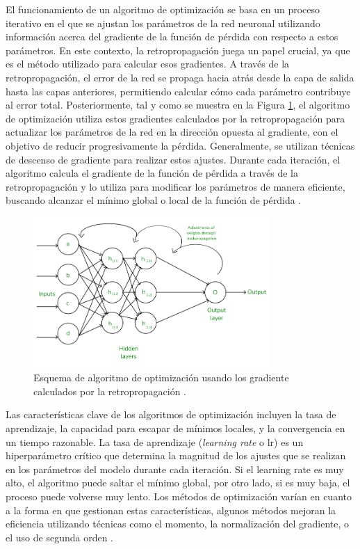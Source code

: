 El funcionamiento de un algoritmo de optimización se basa en un proceso iterativo en el que se ajustan los parámetros de la red neuronal utilizando información acerca del gradiente de la función de pérdida con respecto a estos parámetros. En este contexto, la retropropagación juega un papel crucial, ya que es el método utilizado para calcular esos gradientes. A través de la retropropagación, el error de la red se propaga hacia atrás desde la capa de salida hasta las capas anteriores, permitiendo calcular cómo cada parámetro contribuye al error total. Posteriormente, tal y como se muestra en la Figura \ref{fig:esq-Optimizacion}, el algoritmo de optimización utiliza estos gradientes calculados por la retropropagación para actualizar los parámetros de la red en la dirección opuesta al gradiente, con el objetivo de reducir progresivamente la pérdida. Generalmente, se utilizan técnicas de descenso de gradiente para realizar estos ajustes. Durante cada iteración, el algoritmo calcula el gradiente de la función de pérdida a través de la retropropagación y lo utiliza para modificar los parámetros de manera eficiente, buscando alcanzar el mínimo global o local de la función de pérdida \cite{bottou2010large}.

\begin{figure}[H]
    \centering
    \includegraphics[width=0.8\textwidth]{./img/modelo/retropropagacion.png}
    \caption{Esquema de algoritmo de optimización usando los gradiente calculados por la retropropagación \cite{msmk2023backpropagation}.}
    \label{fig:esq-Optimizacion}
\end{figure}



Las características clave de los algoritmos de optimización incluyen la tasa de aprendizaje, la capacidad para escapar de mínimos locales, y la convergencia en un tiempo razonable. La tasa de aprendizaje (\textit{learning rate} o lr) es un hiperparámetro crítico que determina la magnitud de los ajustes que se realizan en los parámetros del modelo durante cada iteración. Si el learning rate es muy alto, el algoritmo puede saltar el mínimo global, por otro lado, si es muy baja, el proceso puede volverse muy lento. Los métodos de optimización varían en cuanto a la forma en que gestionan estas características, algunos métodos mejoran la eficiencia utilizando técnicas como el momento, la normalización del gradiente, o el uso de segunda orden \cite{kingma2014adam}.



